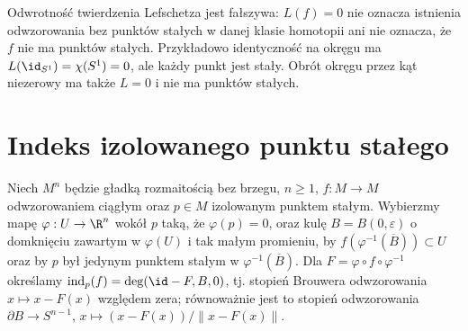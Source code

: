 \begin{uwaga}
Odwrotność twierdzenia Lefschetza jest fałszywa:
$L(f)=0$ nie oznacza istnienia odwzorowania bez punktów
stałych w danej klasie homotopii ani nie oznacza, że
$f$ nie ma punktów stałych. Przykładowo identyczność
na okręgu ma $L(\id_{S^1})=\chi(S^1)=0$, ale każdy
punkt jest stały. Obrót okręgu przez kąt niezerowy
ma także $L=0$ i nie ma punktów stałych.
\end{uwaga}

\section{Indeks izolowanego punktu stałego}
\begin{definicja}
\label{def:fixed-index-v10}
Niech $M^n$ będzie gładką rozmaitością bez brzegu,
$n\ge1$, $f:M\to M$ odwzorowaniem ciągłym oraz
$p\in M$ izolowanym punktem stałym. Wybierzmy mapę
$\varphi:U\to\R^n$ wokół $p$ taką, że $\varphi(p)=0$,
oraz kulę $B=B(0,\varepsilon)$ o domknięciu zawartym
w $\varphi(U)$ i tak małym promieniu, by
$f(\varphi^{-1}(\overline B))\subset U$ oraz by
$p$ był jedynym punktem stałym w
$\varphi^{-1}(\overline B)$.
Dla $F=\varphi\circ f\circ\varphi^{-1}$
określamy
$\operatorname{ind}_p(f)=\deg(\id-F,B,0)$,
tj. stopień Brouwera odwzorowania
$x\mapsto x-F(x)$ względem zera; równoważnie jest to
stopień odwzorowania
$\partial B\to S^{n-1}$, $x\mapsto(x-F(x))/\|x-F(x)\|$.
\end{definicja}

